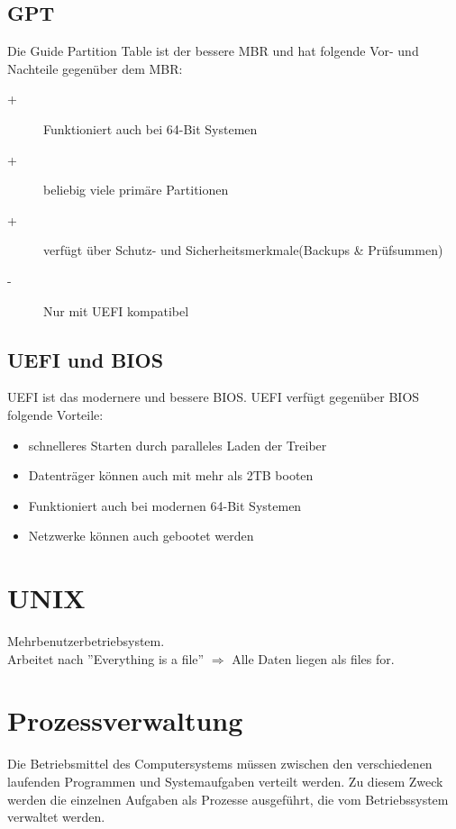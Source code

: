 \documentclass[12pt,a4paper]{article}
\begin{document}
	\subsection{GPT}
		Die Guide Partition Table ist der bessere MBR und hat folgende Vor- und Nachteile gegenüber dem MBR:
		\begin{description}
			\item[+]{Funktioniert auch bei 64-Bit Systemen}
			\item[+]{beliebig viele primäre Partitionen}
			\item[+]{verfügt über Schutz- und Sicherheitsmerkmale(Backups \& Prüfsummen)}
			\item[-]{Nur mit UEFI kompatibel}
		\end{description}
	
	\subsection{UEFI und BIOS}
		UEFI ist das modernere und bessere BIOS. UEFI verfügt gegenüber BIOS folgende Vorteile:
		\begin{itemize}
			\item schnelleres Starten durch paralleles Laden der Treiber
			\item Datenträger können auch mit mehr als 2TB booten
			\item Funktioniert auch bei modernen 64-Bit Systemen
			\item Netzwerke können auch gebootet werden
		\end{itemize}

				
\section{UNIX}
	Mehrbenutzerbetriebsystem.\\
	Arbeitet nach ''Everything is a file'' $\Rightarrow$ Alle Daten liegen als files for.

\section{Prozessverwaltung}
	Die Betriebsmittel des Computersystems müssen zwischen den verschiedenen laufenden Programmen und Systemaufgaben verteilt werden. Zu diesem Zweck werden die einzelnen Aufgaben als Prozesse ausgeführt, die vom Betriebssystem verwaltet werden.
	
\end{document}
